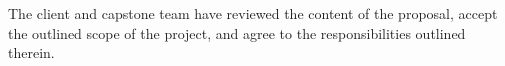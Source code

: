 The client and capstone team have reviewed the content of the proposal, accept the outlined scope of the project, and agree to the responsibilities outlined therein.